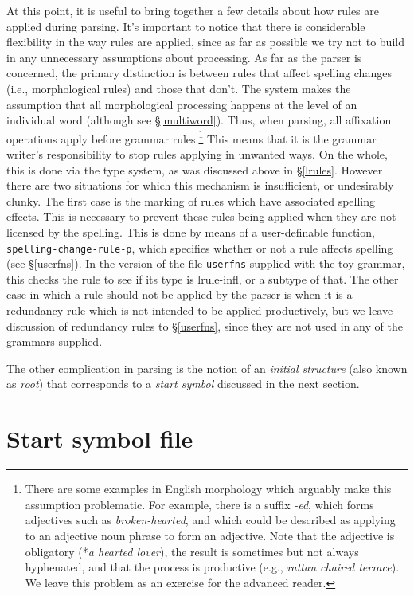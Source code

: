 \documentclass[12pt]{report}
\newcommand{\filename}[1]{{\tt #1}}
\newcommand{\functionname}[1]{{\tt #1}}
\newcommand{\newterm}[1]{{\it #1}}
\begin{document}
At this point, it is useful to bring together a few details
about how rules are applied during parsing.
It's important to notice that there is
considerable flexibility in the way rules are applied, 
since as far as possible
we try not to build in any unnecessary assumptions about processing.  
As far as
the parser is concerned, the primary distinction is between rules that affect
spelling changes (i.e., morphological rules) and those that don't.  The system
makes the assumption that all morphological processing happens at the level of
an individual word (although see \S\ref{multiword}).  Thus, when parsing, all
affixation operations apply before grammar rules.\footnote{There are some
examples in English morphology which arguably make this assumption problematic.
For example, there is a suffix {\it -ed}, which forms adjectives such as {\it
broken-hearted}, and which could be described as applying to an adjective noun phrase to
form an adjective.  Note that the adjective is obligatory (*{\it a hearted
lover}), the result is sometimes but not always hyphenated, and that the
process is productive (e.g., {\it rattan chaired terrace}).  We leave this
problem as an exercise for the advanced reader.}
This means that it is the grammar writer's responsibility to
stop rules applying in unwanted ways.  On the whole, this is done
via the type system, as was discussed above in \S\ref{lrules}.
However there are two situations for which this mechanism 
is insufficient, or undesirably clunky.
The first case is the marking of rules which have associated spelling 
effects.  This is necessary to prevent these rules being applied
when they are not licensed by the spelling.  This is done by means
of a user-definable function, \functionname{spelling-change-rule-p},
which specifies whether or not a rule
affects spelling (see \S\ref{userfns}).  In the 
version of the file \filename{userfns} supplied with the toy grammar,
this checks the rule to see if its type is {\type lrule-infl}, or
a subtype of that.
The other case in which a rule should not be applied by the 
parser is when it is a redundancy rule which
is not intended to be applied productively, but we leave discussion of
redundancy rules 
to \S\ref{userfns}, since they are not used in any of the grammars
supplied.

The other complication in parsing is the notion of an 
\newterm{initial structure} 
(also known as \newterm{root})
that corresponds to a \newterm{start symbol}
discussed in the next section.


\section{Start symbol file}
\label{root}
\end{document}
